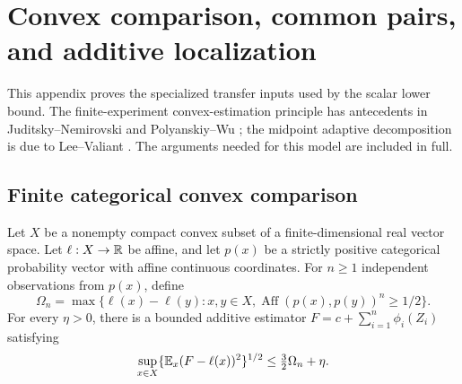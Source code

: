 \section{Convex comparison, common pairs, and additive localization}
\label{sec:transfer-foundations}

This appendix proves the specialized transfer inputs used by the scalar
lower bound. The finite-experiment
convex-estimation principle has antecedents in
Juditsky--Nemirovski and Polyanskiy--Wu \cite{jn,pw};
the midpoint adaptive decomposition is due to Lee--Valiant \cite{lv}.
The arguments needed for this model are included in full.

\subsection{Finite categorical convex comparison}

\begin{lemma}
\label{lem:finite-comparison}
Let $X$ be a nonempty compact convex subset of a finite-dimensional real vector
space. Let $\ell:X\to\mathbb R$ be affine, and let $p(x)$ be a strictly positive
categorical probability vector with affine continuous coordinates. For $n\ge1$
independent observations from $p(x)$, define
\[
 \Omega_n=\max\{\ell(x)-\ell(y):x,y\in X,
                  \operatorname{Aff}(p(x),p(y))^n\ge1/2\}.
\]
For every $\eta>0$, there is a bounded additive estimator
$F=c+\sum_{i=1}^n\phi_i(Z_i)$ satisfying
\begin{equation}
 \sup_{x\in X}\{\mathbb E_x(F-\ell(x))^2\}^{1/2}
 \le\tfrac32\Omega_n+\eta.
 \label{eq:finite-comparison}
\end{equation}
\end{lemma}

